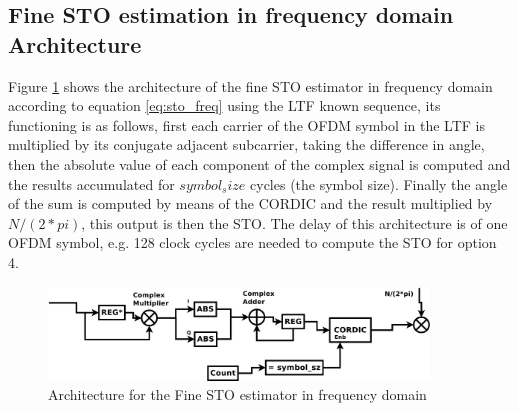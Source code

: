 



\subsection{Fine STO estimation in frequency domain Architecture} 

Figure \ref{fig:arq_fine_sto_freq} shows the architecture of the fine STO estimator in frequency domain according to equation \ref{eq:sto_freq} using the LTF known sequence, its functioning is as follows, first each carrier of the OFDM symbol in the LTF is multiplied by its conjugate adjacent subcarrier, taking the difference in angle, then the absolute value of each component of the complex signal is computed and the results accumulated for $symbol_size$ cycles (the symbol size). Finally the angle of the sum is computed by means of the CORDIC and the result multiplied by $N/(2*pi)$, this output is then the STO. The delay of this architecture is of one OFDM symbol, e.g. 128 clock cycles are needed to compute the STO for option 4. 

\begin{figure}[!hbt]
  \centering
    \includegraphics[width=0.9\textwidth]
      {./figures/fine_sto_freq}
  \caption{Architecture for the Fine STO estimator in frequency domain}
  \label{fig:arq_fine_sto_freq}
\end{figure}

